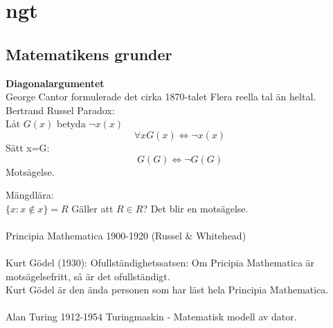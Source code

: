\chapter{ngt}
\section{Matematikens grunder}
\textbf{Diagonalargumentet}\\
George Cantor formulerade det cirka 1870-talet
Flera reella tal än heltal.\\
Bertrand Russel Paradox:\\
 Låt $G(x)$ betyda $\neg x(x)$
$$\forall x G(x) \iff \neg x(x)$$ 
Sätt x=G:
$$G(G) \iff \neg G(G)$$
Motsägelse.

Mängdlära:\\
$\{x:x\not \in x\}=R$
Gäller att $R\in R$? Det blir en motsägelse.\\\\
Principia Mathematica 1900-1920 (Russel \& Whitehead)\\\\
Kurt Gödel (1930): Ofullständighetssatsen: Om Pricipia Mathematica är motsägelsefritt, så är det ofullständigt.\\
Kurt Gödel är den ända personen som har läst hela Principia Mathematica.\\\\
Alan Turing 1912-1954
Turingmaskin - Matematisk modell av dator.